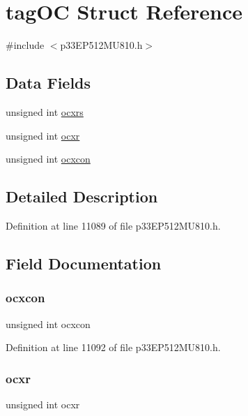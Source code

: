 \hypertarget{structtag_o_c}{}\section{tag\+OC Struct Reference}
\label{structtag_o_c}


{\ttfamily \#include $<$p33\+E\+P512\+M\+U810.\+h$>$}

\subsection*{Data Fields}
\begin{DoxyCompactItemize}
\item 
unsigned int \hyperlink{structtag_o_c_ae0b9ec26b0c1cf6a041e02a5267bb9b3}{ocxrs}
\item 
unsigned int \hyperlink{structtag_o_c_ac406e1c79f69cbfc0cbf6c31bffb7bb8}{ocxr}
\item 
unsigned int \hyperlink{structtag_o_c_a4e64ca0c8cd27111d8f2a9cb69021129}{ocxcon}
\end{DoxyCompactItemize}


\subsection{Detailed Description}


Definition at line 11089 of file p33\+E\+P512\+M\+U810.\+h.



\subsection{Field Documentation}
\mbox{\label{structtag_o_c_a4e64ca0c8cd27111d8f2a9cb69021129}} 
\subsubsection{\texorpdfstring{ocxcon}{ocxcon}}
{\footnotesize\ttfamily unsigned int ocxcon}



Definition at line 11092 of file p33\+E\+P512\+M\+U810.\+h.

\mbox{\label{structtag_o_c_ac406e1c79f69cbfc0cbf6c31bffb7bb8}} 
\subsubsection{\texorpdfstring{ocxr}{ocxr}}
{\footnotesize\ttfamily unsigned int ocxr}



